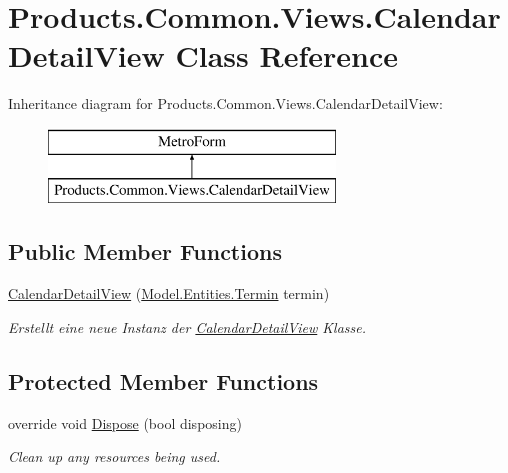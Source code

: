 \hypertarget{class_products_1_1_common_1_1_views_1_1_calendar_detail_view}{}\section{Products.\+Common.\+Views.\+Calendar\+Detail\+View Class Reference}
\label{class_products_1_1_common_1_1_views_1_1_calendar_detail_view}
Inheritance diagram for Products.\+Common.\+Views.\+Calendar\+Detail\+View\+:\begin{figure}[H]
\begin{center}
\leavevmode
\includegraphics[height=2.000000cm]{class_products_1_1_common_1_1_views_1_1_calendar_detail_view}
\end{center}
\end{figure}
\subsection*{Public Member Functions}
\begin{DoxyCompactItemize}
\item 
\hyperlink{class_products_1_1_common_1_1_views_1_1_calendar_detail_view_a14f7e423b5d369a5e122d6ca50e19742}{Calendar\+Detail\+View} (\hyperlink{class_products_1_1_model_1_1_entities_1_1_termin}{Model.\+Entities.\+Termin} termin)
\begin{DoxyCompactList}\small\item\em Erstellt eine neue Instanz der \hyperlink{class_products_1_1_common_1_1_views_1_1_calendar_detail_view}{Calendar\+Detail\+View} Klasse. \end{DoxyCompactList}\end{DoxyCompactItemize}
\subsection*{Protected Member Functions}
\begin{DoxyCompactItemize}
\item 
override void \hyperlink{class_products_1_1_common_1_1_views_1_1_calendar_detail_view_aaff2fa32f883229b1eec642a5194abac}{Dispose} (bool disposing)
\begin{DoxyCompactList}\small\item\em Clean up any resources being used. \end{DoxyCompactList}\end{DoxyCompactItemize}


